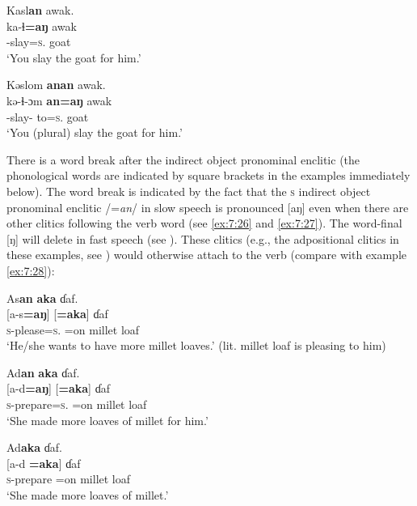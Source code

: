 \ea\label{ex:7:24}
Kasl\textbf{an}  awak.\\
\gll ka-ɬ\textbf{=aŋ}      awak\\
{\twoS}-slay=\textsc{s}.{\IO}    goat\\
\glt ‘You slay the goat for him.’ 
\z

\ea\label{ex:7:25}
Kəslom  \textbf{anan}  awak.\\
\gll kə-ɬ{}-ɔm  \textbf{an=aŋ}    awak\\
-slay-{\twoP}  to=\textsc{s}.{\IO}  goat\\
\glt ‘You (plural) slay the goat for him.’  
\z

There is a word break after the indirect object pronominal enclitic (the phonological words are indicated by square brackets in the examples immediately below).  The word break is indicated by the fact that the \textsc{s} indirect object pronominal enclitic /=\textit{an}/ in slow speech is pronounced [aŋ] even when there are other clitics following the verb word (see \ref{ex:7:26} and \ref{ex:7:27}). The word-final [ŋ] will delete in fast speech (see ). These clitics (e.g., the adpositional clitics in these examples, see ) would otherwise attach to the verb (compare with example \ref{ex:7:28}):

\ea\label{ex:7:26}
As\textbf{an}  \textbf{aka}  ɗaf.\\
\gll {}[a-s\textbf{=aŋ}] [\textbf{=aka}]    ɗaf\\
\textsc{s}-please=\textsc{s}.{\IO}  =on    {millet loaf}\\
\glt ‘He/she wants to have more millet loaves.’ (lit. millet loaf is pleasing to him)  
\z

\ea\label{ex:7:27}
Ad\textbf{an}  \textbf{aka}  ɗaf.\\
\gll {}[a-d\textbf{=aŋ}] [\textbf{=aka}]    ɗaf\\
\textsc{s}-prepare=\textsc{s}.{\IO}  =on    {millet loaf}\\
\glt ‘She made more loaves of millet for him.’
\z

\ea\label{ex:7:28}
Ad\textbf{aka}  ɗaf.\\
\gll {}[a-d \textbf{=aka}]        ɗaf\\
\textsc{s}-prepare =on      {millet loaf}\\
\glt ‘She made more loaves of millet.’  
\z

